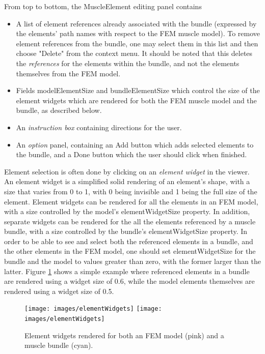 \documentclass{article}
\begin{document}
From top to bottom, the MuscleElement editing panel contains

\begin{itemize}

\item A list of element references already associated
with the bundle (expressed by the elements' path names with respect to
the FEM muscle model).  To remove element references from the bundle, one may
select them in this list and then choose {\sf "Delete"} from the
context menu. It should be noted that this deletes the {\it references}
for the elements within the bundle, and not the elements themselves
from the FEM model.

\item Fields {\sf modelElementSize} and {\sf bundleElementSize} which control the
size of the element widgets which are rendered for both the FEM muscle
model and the bundle, as described below.

\item An {\it instruction box} containing directions for the user.

\item An {\it option} panel, containing an {\sf Add} button which adds selected
elements to the bundle, and a {\sf Done} button which the user should
click when finished.

\end{itemize}

Element selection is often done by clicking on an {\it element widget} in
the viewer. An element widget is a simplified solid rendering of an
element's shape, with a size that varies from 0 to 1, with 0 being
invisible and 1 being the full size of the element.  Element widgets
can be rendered for all the elements in an FEM model, with a size
controlled by the model's {\sf elementWidgetSize} property. In addition,
separate widgets can be rendered for the all the elements referenced
by a muscle bundle, with a size controlled by the bundle's
{\sf elementWidgetSize} property. In order to be able to see and select
both the referenced elements in a bundle, and the other
elements in the FEM model, one should set {\sf elementWidgetSize} for the
bundle and the model to values greater than zero, with the former
larger than the latter. Figure \ref{elementWidgetsFig} shows a simple example
where referenced elements in a bundle are rendered using a widget size of
0.6, while the model elements themselves are rendered using
a widget size of 0.5.

\begin{figure}
\begin{center}
\iflatexml
\texttt{[image: images/elementWidgets]}
\else
\texttt{[image: images/elementWidgets]}
\fi
\end{center}
\caption{Element widgets rendered for both an FEM model (pink) 
and a muscle bundle (cyan).}%
\label{elementWidgetsFig}
\end{figure}
\end{document}
